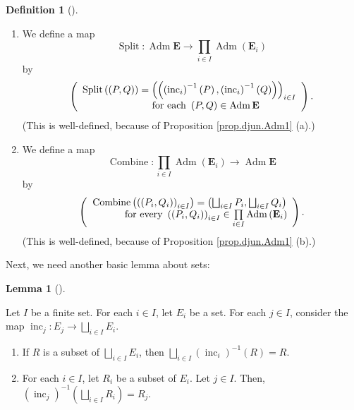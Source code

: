 \documentclass[numbers=enddot,12pt,final,onecolumn,notitlepage,abstracton]{scrartcl}
\theoremstyle{definition}
\newtheorem{lem}[theo]{Lemma}
\newenvironment{lemma}[1][]
{\begin{lem}[#1]\begin{leftbar}}
{\end{leftbar}\end{lem}}
\newtheorem{defi}[theo]{Definition}
\newenvironment{definition}[1][]
{\begin{defi}[#1]\begin{leftbar}}
{\end{leftbar}\end{defi}}
\let\prodnonlimits\prod
\renewcommand{\prod}{\prodnonlimits\limits}
\newenvironment{verlong}{}{}
\begin{document}
\begin{verlong}
\begin{footnotesize}
\begin{definition}
\begin{enumerate}
\item[(a)] We define a map
\[
\operatorname*{Split}:\operatorname*{Adm}\mathbf{E}\rightarrow\prod_{i\in
I}\operatorname*{Adm}\left(  \mathbf{E}_{i}\right)
\]
by%
\[
\left(
\begin{array}
[c]{c}%
\operatorname*{Split}\left(  \left(  P,Q\right)  \right)  =\left(  \left(
\left(  \operatorname*{inc}\nolimits_{i}\right)  ^{-1}\left(  P\right)
,\left(  \operatorname*{inc}\nolimits_{i}\right)  ^{-1}\left(  Q\right)
\right)  \right)  _{i\in I}\\
\ \ \ \ \ \ \ \ \ \ \text{for each }\left(  P,Q\right)  \in\operatorname*{Adm}%
\mathbf{E}%
\end{array}
\right)  .
\]
(This is well-defined, because of Proposition \ref{prop.djun.Adm1} (a).)

\item[(b)] We define a map
\[
\operatorname*{Combine}:\prod_{i\in I}\operatorname*{Adm}\left(
\mathbf{E}_{i}\right)  \rightarrow\operatorname*{Adm}\mathbf{E}%
\]
by%
\[
\left(
\begin{array}
[c]{c}%
\operatorname*{Combine}\left(  \left(  \left(  P_{i},Q_{i}\right)  \right)
_{i\in I}\right)  =\left(  \bigsqcup_{i\in I}P_{i},\bigsqcup_{i\in I}%
Q_{i}\right) \\
\ \ \ \ \ \ \ \ \ \ \text{for every }\left(  \left(  P_{i},Q_{i}\right)
\right)  _{i\in I}\in\prod_{i\in I}\operatorname*{Adm}\left(  \mathbf{E}%
_{i}\right)
\end{array}
\right)  .
\]
(This is well-defined, because of Proposition \ref{prop.djun.Adm1} (b).)
\end{enumerate}
\end{definition}

Next, we need another basic lemma about sets:

\begin{lemma}
\label{lem.djun.Adm-bij.1}Let $I$ be a finite set. For each $i\in I$, let
$E_{i}$ be a set. For each $j\in I$, consider the map $\operatorname*{inc}%
\nolimits_{j}:E_{j}\rightarrow\bigsqcup_{i\in I}E_{i}$.

\begin{enumerate}
\item[(a)] If $R$ is a subset of $\bigsqcup_{i\in I}E_{i}$, then
$\bigsqcup_{i\in I}\left(  \operatorname*{inc}\nolimits_{i}\right)
^{-1}\left(  R\right)  =R$.

\item[(b)] For each $i\in I$, let $R_{i}$ be a subset of $E_{i}$. Let $j\in
I$. Then, $\left(  \operatorname*{inc}\nolimits_{j}\right)  ^{-1}\left(
\bigsqcup_{i\in I}R_{i}\right)  =R_{j}$.
\end{enumerate}
\end{lemma}


\end{footnotesize}
\end{verlong}
\end{document}
